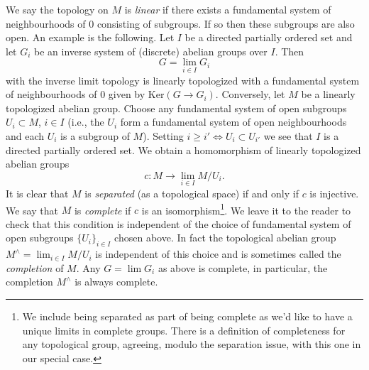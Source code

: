 \medskip\noindent
We say the topology on $M$ is {\it linear} if there exists a fundamental
system of neighbourhoods of $0$ consisting of subgroups. If so then these
subgroups are also open. An example is the following. Let $I$ be a directed
partially ordered set and let $G_i$ be an inverse system of (discrete)
abelian groups over $I$. Then
$$
G = \lim_{i \in I} G_i
$$
with the inverse limit topology is linearly topologized with a fundamental
system of neighbourhoods of $0$ given by $\text{Ker}(G \to G_i)$.
Conversely, let $M$ be a linearly topologized abelian group.
Choose any fundamental system of open subgroups $U_i \subset M$, $i \in I$
(i.e., the $U_i$ form a fundamental system of open neighbourhoods and
each $U_i$ is a subgroup of $M$). Setting
$i \geq i' \Leftrightarrow U_i \subset U_{i'}$ we see that $I$
is a directed partially ordered set. We obtain a homomorphism of
linearly topologized abelian groups
$$
c : M \longrightarrow \lim_{i \in I} M/U_i.
$$
It is clear that $M$ is {\it separated} (as a topological space)
if and only if $c$ is injective. We say that $M$ is {\it complete}
if $c$ is an isomorphism\footnote{We include being separated as part
of being complete as we'd like to have a unique limits in complete
groups. There is a definition of completeness for any topological group,
agreeing, modulo the separation issue, with this one in our special case.}.
We leave it to the reader to check that this condition is independent of
the choice of fundamental system of open subgroups $\{U_i\}_{i \in I}$
chosen above. In fact the topological abelian group
$M^\wedge = \lim_{i \in I} M/U_i$ is independent of this
choice and is sometimes called the {\it completion} of $M$.
Any $G = \lim G_i$ as above is complete, in particular,
the completion $M^\wedge$ is always complete.

